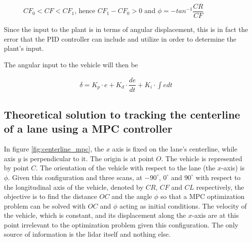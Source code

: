 \documentclass[oneside,12pt]{article}
\begin{document}
    \begin{figure}[H]\centering
      \scalebox{1}{}
      \caption{$CF_0 < CF < CF_1$, hence $CF_1 - CF_0 > 0$ and $\phi = -tan^{-1} \dfrac{CR}{CF}$}
      \label{fig:range_diff_negative}
    \end{figure}


    Since the input to the plant is in terms of angular displacement, this
    is in fact the error that the PID controller can include and utilize in
    order to determine the plant's input.

    The angular input to the vehicle will then be

    \begin{align}
      \delta = K_p \cdot e + K_d \cdot \dfrac{de}{dt} + K_i \cdot \int e dt
    \end{align}






















  \subsection{Theoretical solution to tracking the centerline of a lane using
    a MPC controller}


    In figure \ref{fig:centerline_mpc}, the $x$ axis is fixed on the lane's
    centerline, while axis $y$ is perpendicular to it. The origin is at point
    $O$. The vehicle is represented by point $C$. The orientation of the vehicle
    with respect to the lane (the $x$-axis) is $\phi$. Given this configuration
    and three scans, at $-90^{\circ}$, $0^{\circ}$ and $90^{\circ}$ with
    respect to the longitudinal axis of the vehicle, denoted by $CR$, $CF$ and
    $CL$ respectively, the objective is to find the distance $OC$ and the angle
    $\phi$ so that a MPC optimization problem can be solved with $OC$ and $\phi$
    acting as initial conditions. The velocity of the vehicle,
    which is constant, and its displacement along the $x$-axis are at this point
    irrelevant to the optimization problem given this configuration. The only
    source of information is the lidar itself and nothing else.
\end{document}
